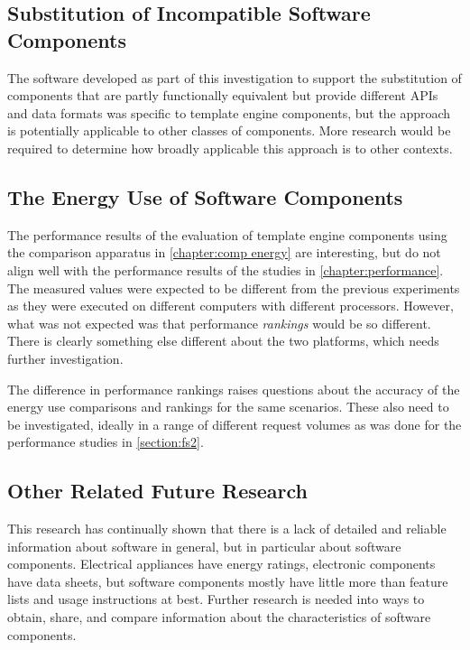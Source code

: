 \subsection{Substitution of Incompatible Software Components}

The software developed as part of this investigation to support the substitution of components that are partly functionally equivalent but provide different APIs and data formats was specific to \gls{template engine} components, but the approach is potentially applicable to other classes of components. More research would be required to determine how broadly applicable this approach is to other contexts.

\subsection{The Energy Use of Software Components}

The performance results of the evaluation of \gls{template engine} components using the comparison apparatus in \autoref{chapter:comp energy} are interesting, but do not align well with the performance results of the studies in \autoref{chapter:performance}. The measured values were expected to be different from the previous experiments as they were executed on different computers with different processors. However, what was not expected was that performance \emph{rankings} would be so different. There is clearly something else different about the two platforms, which needs further investigation.

The difference in performance rankings raises questions about the accuracy of the energy use comparisons and rankings for the same scenarios. These also need to be investigated, ideally in a range of different request volumes as was done for the performance studies in \autoref{section:fs2}. 

\subsection{Other Related Future Research}

This research has continually shown that there is a lack of detailed and reliable information about software in general, but in particular about software components. Electrical appliances have energy ratings, electronic components have data sheets, but software components mostly have little more than feature lists and usage instructions at best. Further research is needed into ways to obtain, share, and compare information about the characteristics of software components.

